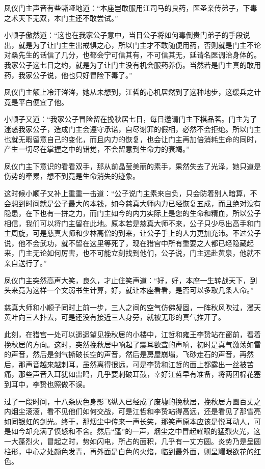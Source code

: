 凤仪门主声音有些嘶哑地道：“本座岂敢服用江司马的良药，医圣亲传弟子，下毒之术天下无双，本门主还不敢尝试。”

小顺子傲然道：“这也在我家公子意中，当日公子将如何毒倒贵门弟子的手段说出，就是为了让门主生出戒惧之心，所以门主才不敢随便用药，否则就是门主不论对桑先生的话信了几分，也都会宁可信其有，不可信其无，延请名医调治身体的。我家公子这七日之约，就是为了让门主没有机会服药养伤。当然若是门主真的敢用药，我家公子说，他也只好冒险下毒了。”

凤仪门主额上冷汗涔涔，她从未想到，江哲的心机居然到了这种地步，这缓兵之计竟是平白便宜了他。

小顺子又道：“我家公子冒险留在挽秋居七日，每日邀请门主下棋品茗。门主为了迷惑我家公子，造成门主会遵守承诺，自尽谢罪的假相，必然不会拒绝。所以门主也就无暇留意自己的变化，而且内力的恢复，也会让门主再加倍消耗生命的同时，产生一切尽在掌握之中的错觉，不会留意到生命力的衰竭。”

凤仪门主下意识的看看双手，那从前晶莹美丽的素手，果然失去了光泽，她只道是伤势的牵累，想不到竟是生命消失的迹象。

这时候小顺子又补上重重一击道：“公子说门主素来自负，只会防着别人暗算，不会想到时间就是公子最大的本钱，如今慈真大师内力已经恢复五成，而且绝对没有隐患，在下也有一拼之力，而门主如今的内力实际上是您的生命和精血，所以公子相信，我们可以将门主留在此地。原本若是慈真大师不来，公子只少尽出高手和门主周旋，可是慈真大师和少林高僧的到来，让公子手上的人力更加充沛。不过公子说，他不会武功，就不留在这里等死了，现在猎宫中所有重要之人都已经隐藏起来，门主无论如何厉害，也不可能立刻找到他们，公子说，门主远赴黄泉，他就不亲自送行了。”

凤仪门主突然高声大笑，良久，才止住笑声道：“好，好，本座一生转战天下，到头来竟为这样一个文弱书生计算，好，就让本座看看，是否可以多取几条人命。”

慈真大师和小顺子同时上前一步，三人之间的空气仿佛凝固，一阵秋风吹过，漫天黄叶向三人扑去，可是还没有接近三人身旁，就被无形的真气推开了。

此刻，在猎宫一处可以遥遥望见挽秋居的小楼中，江哲和雍王李贽站在窗前，看着挽秋居的方向。这时，突然挽秋居中响起了震耳欲聋的声响，初时是真气激荡如雷的声音，然后是剑气撕破长空的声音，然后是房屋崩塌，飞砂走石的声音，再然后，那声音越来越刺耳，虽然离得很远，可是李贽和江哲的面上都露出一丝被苦痛，那些声音入耳犹如雷鸣，几乎要刺破耳鼓，幸好江哲早有准备，将两团棉花塞到耳中，李贽也照做不误。

过了一段时间，十八条灰色身影飞纵入已经成了废墟的挽秋居，挽秋居方圆百丈之内烟尘滚滚，看不见他们如何交战，可是江哲和李贽站得高远，还是看见了那雪亮如同银虹的剑光。终于，那烟尘中传来一声长笑，那笑声原本应该是悦耳动人，可是如今却充满了愤怒和不舍。然后“蓬”的一声，烟尘之中冒起耀眼的猛烈火光，这一大蓬烈火，冒起之时，势如闪电，所占的面积，几乎有一丈方圆。炎势乃是呈圆柱形，中心之处颜色发青，再外面是白色的火焰，临到最外面，则呈耀眼欲花的红色。

